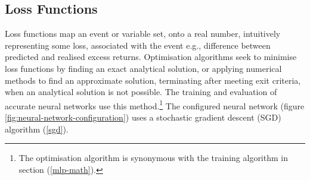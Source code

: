 \documentclass[12pt]{article}
\begin{document}
\subsection{Loss Functions}
Loss functions map an event or variable set, onto a real number, intuitively representing some loss, associated with the event e.g., difference between predicted and realised excess returns.
Optimisation algorithms seek to minimise loss functions by finding an exact analytical solution, or applying numerical methods to find an approximate solution, terminating after meeting exit criteria, when an analytical solution is not possible.
The training and evaluation of accurate neural networks use this method.\footnote{The optimisation algorithm is synonymous with the training algorithm in section (\ref{mlp-math}).}
The configured neural network (figure \ref{fig:neural-network-configuration}) uses a stochastic gradient descent (SGD) algorithm (\ref{sgd}).
\end{document}
